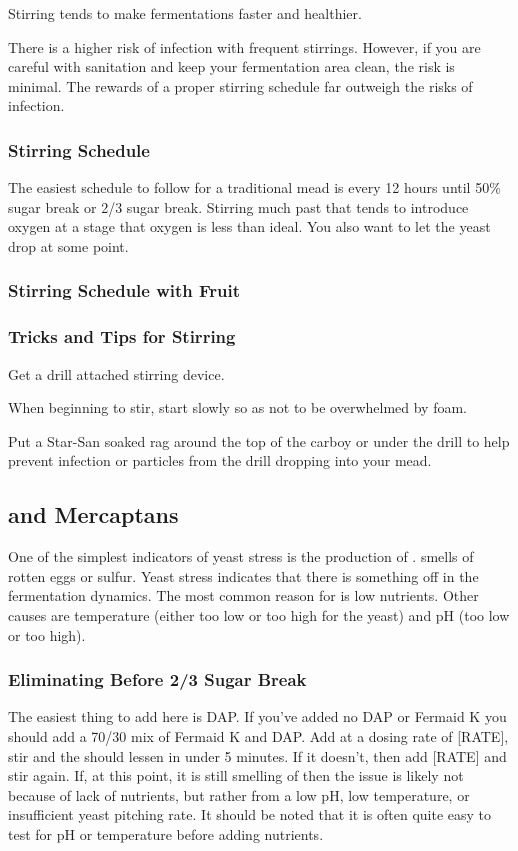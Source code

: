 \documentclass{article}
\begin{document}
  Stirring tends to make fermentations faster and healthier. 

  There is a higher risk of infection with frequent stirrings. However, if you are careful with sanitation and keep your fermentation area clean, the risk is minimal.
  The rewards of a proper stirring schedule far outweigh the risks of infection.

  \subsubsection{Stirring Schedule}
   The easiest schedule to follow for a traditional mead is every 12 hours until 50\% sugar break or 2/3 sugar break. Stirring much past that tends to introduce
   oxygen at a stage that oxygen is less than ideal. You also want to let the yeast drop at some point.

  \subsubsection{Stirring Schedule with Fruit}

  \subsubsection{Tricks and Tips for Stirring}
   Get a drill attached stirring device.

   When beginning to stir, start slowly so as not to be overwhelmed by foam. 

   Put a Star-San soaked rag around the top of the carboy or under the drill to help prevent infection or particles from the drill dropping into your mead.

 \subsection{ and Mercaptans}
  One of the simplest indicators of yeast stress is the production of .  smells of rotten eggs or sulfur. Yeast stress indicates that there is
  something off in the fermentation dynamics. The most common reason for  is low nutrients. Other causes are temperature (either too low or too high for 
  the yeast) and pH (too low or too high).

  \subsubsection{Eliminating Before 2/3 Sugar Break}
   The easiest thing to add here is DAP. If you've added no DAP or Fermaid K you should add a 70/30 mix of Fermaid K and DAP. Add at a dosing rate of [RATE], stir and the 
    should lessen in under 5 minutes. If it doesn't, then add [RATE] and stir again. If, at this point, it is still smelling of  then the issue is likely
   not because of lack of nutrients, but rather from a low pH, low temperature, or insufficient yeast pitching rate. It should be noted that it is often quite easy 
   to test for pH or temperature before adding nutrients.
\end{document}
